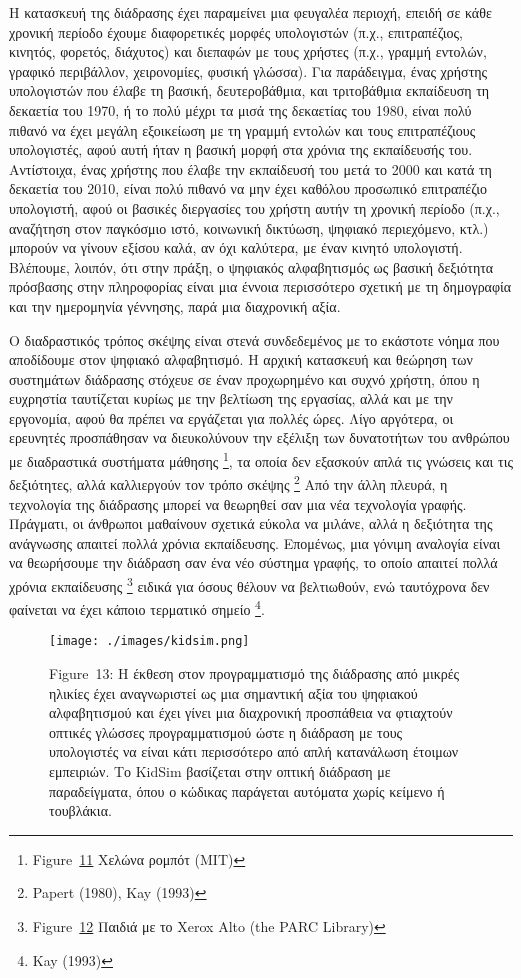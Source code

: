 \documentclass[
]{article}
\begin{document}
Η κατασκευή της διάδρασης έχει παραμείνει μια φευγαλέα περιοχή, επειδή
σε κάθε χρονική περίοδο έχουμε διαφορετικές μορφές υπολογιστών (π.χ.,
επιτραπέζιος, κινητός, φορετός, διάχυτος) και διεπαφών με τους χρήστες
(π.χ., γραμμή εντολών, γραφικό περιβάλλον, χειρονομίες, φυσική γλώσσα).
Για παράδειγμα, ένας χρήστης υπολογιστών που έλαβε τη βασική,
δευτεροβάθμια, και τριτοβάθμια εκπαίδευση τη δεκαετία του 1970, ή το
πολύ μέχρι τα μισά της δεκαετίας του 1980, είναι πολύ πιθανό να έχει
μεγάλη εξοικείωση με τη γραμμή εντολών και τους επιτραπέζιους
υπολογιστές, αφού αυτή ήταν η βασική μορφή στα χρόνια της εκπαίδευσής
του. Αντίστοιχα, ένας χρήστης που έλαβε την εκπαίδευσή του μετά το 2000
και κατά τη δεκαετία του 2010, είναι πολύ πιθανό να μην έχει καθόλου
προσωπικό επιτραπέζιο υπολογιστή, αφού οι βασικές διεργασίες του χρήστη
αυτήν τη χρονική περίοδο (π.χ., αναζήτηση στον παγκόσμιο ιστό, κοινωνική
δικτύωση, ψηφιακό περιεχόμενο, κτλ.) μπορούν να γίνουν εξίσου καλά, αν
όχι καλύτερα, με έναν κινητό υπολογιστή. Βλέπουμε, λοιπόν, ότι στην
πράξη, ο ψηφιακός αλφαβητισμός ως βασική δεξιότητα πρόσβασης στην
πληροφορίας είναι μια έννοια περισσότερο σχετική με τη δημογραφία και
την ημερομηνία γέννησης, παρά μια διαχρονική αξία.

Ο διαδραστικός τρόπος σκέψης είναι στενά συνδεδεμένος με το εκάστοτε
νόημα που αποδίδουμε στον ψηφιακό αλφαβητισμό. Η αρχική κατασκευή και
θεώρηση των συστημάτων διάδρασης στόχευε σε έναν προχωρημένο και συχνό
χρήστη, όπου η ευχρηστία ταυτίζεται κυρίως με την βελτίωση της εργασίας,
αλλά και με την εργονομία, αφού θα πρέπει να εργάζεται για πολλές ώρες.
Λίγο αργότερα, οι ερευνητές προσπάθησαν να διευκολύνουν την εξέλιξη των
δυνατοτήτων του ανθρώπου με διαδραστικά συστήματα μάθησης \footnote{Figure~\protect\hyperlink{fig:logo-robot}{11}
  Χελώνα ρομπότ (MIT)}, τα οποία δεν εξασκούν απλά τις γνώσεις και τις
δεξιότητες, αλλά καλλιεργούν τον τρόπο σκέψης \footnote{Papert (1980),
  Kay (1993)} Από την άλλη πλευρά, η τεχνολογία της διάδρασης μπορεί να
θεωρηθεί σαν μια νέα τεχνολογία γραφής. Πράγματι, οι άνθρωποι μαθαίνουν
σχετικά εύκολα να μιλάνε, αλλά η δεξιότητα της ανάγνωσης απαιτεί πολλά
χρόνια εκπαίδευσης. Επομένως, μια γόνιμη αναλογία είναι να θεωρήσουμε
την διάδραση σαν ένα νέο σύστημα γραφής, το οποίο απαιτεί πολλά χρόνια
εκπαίδευσης \footnote{Figure~\protect\hyperlink{fig:children-alto}{12}
  Παιδιά με το Xerox Alto (the PARC Library)} ειδικά για όσους θέλουν να
βελτιωθούν, ενώ ταυτόχρονα δεν φαίνεται να έχει κάποιο τερματικό σημείο
\footnote{Kay (1993)}.

\leavevmode{}%
\begin{figure}
\hypertarget{fig:kidsim}{%
\centering
\texttt{[image: ./images/kidsim.png]}
\caption{Figure~13: Η έκθεση στον προγραμματισμό της διάδρασης από
μικρές ηλικίες έχει αναγνωριστεί ως μια σημαντική αξία του ψηφιακού
αλφαβητισμού και έχει γίνει μια διαχρονική προσπάθεια να φτιαχτούν
οπτικές γλώσσες προγραμματισμού ώστε η διάδραση με τους υπολογιστές να
είναι κάτι περισσότερο από απλή κατανάλωση έτοιμων εμπειριών. Το KidSim
βασίζεται στην οπτική διάδραση με παραδείγματα, όπου ο κώδικας παράγεται
αυτόματα χωρίς κείμενο ή τουβλάκια.}\label{fig:kidsim}
}
\end{figure}
\end{document}
